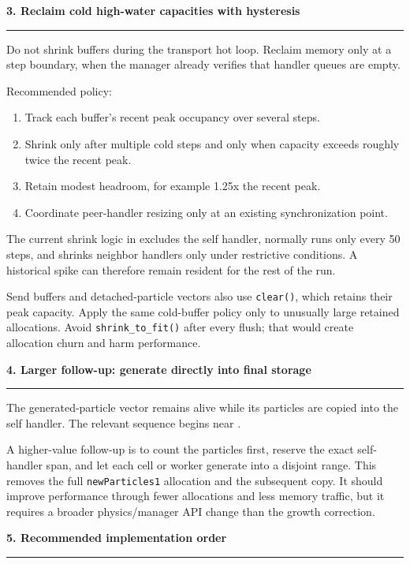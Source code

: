 \documentclass[11pt]{article}
\newcommand{\sectiontitle}[1]{%
  \vspace{4pt}%
  {\Large\bfseries\color{navy} #1}\par
  \vspace{2pt}\textcolor{rule}{\rule{\linewidth}{0.8pt}}\vspace{3pt}
}
\begin{document}
\sectiontitle{3. Reclaim cold high-water capacities with hysteresis}

Do not shrink buffers during the transport hot loop. Reclaim memory only at a
step boundary, when the manager already verifies that handler queues are empty.

Recommended policy:

\begin{enumerate}
  \item Track each buffer's recent peak occupancy over several steps.
  \item Shrink only after multiple cold steps and only when capacity exceeds
        roughly twice the recent peak.
  \item Retain modest headroom, for example 1.25x the recent peak.
  \item Coordinate peer-handler resizing only at an existing synchronization
        point.
\end{enumerate}

The current shrink logic in
 excludes
the self handler, normally runs only every 50 steps, and shrinks neighbor
handlers only under restrictive conditions. A historical spike can therefore
remain resident for the rest of the run.

Send buffers and detached-particle vectors also use \texttt{clear()}, which
retains their peak capacity. Apply the same cold-buffer policy only to unusually
large retained allocations. Avoid \texttt{shrink\_to\_fit()} after every flush;
that would create allocation churn and harm performance.

\sectiontitle{4. Larger follow-up: generate directly into final storage}

The generated-particle vector remains alive while its particles are copied into
the self handler. The relevant sequence begins near
.

A higher-value follow-up is to count the particles first, reserve the exact
self-handler span, and let each cell or worker generate into a disjoint range.
This removes the full \texttt{newParticles1} allocation and the subsequent copy.
It should improve performance through fewer allocations and less memory traffic,
but it requires a broader physics/manager API change than the growth correction.

\sectiontitle{5. Recommended implementation order}
\end{document}

